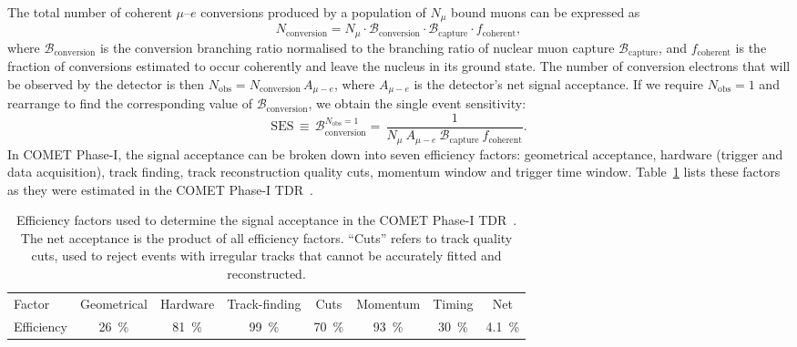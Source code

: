 The total number of coherent $\mu$--$e$ conversions produced by a
population of $N_\mu$ bound muons can be expressed as
$$
N_\mathrm{conversion} = N_\mu \cdot \mathcal{B}_\mathrm{conversion} \cdot
\mathcal{B}_\mathrm{capture} \cdot f_\mathrm{coherent},
$$
where $\mathcal{B}_\mathrm{conversion}$ is the conversion branching ratio
normalised to the branching ratio of nuclear muon capture
$\mathcal{B}_\mathrm{capture}$, and $f_\mathrm{coherent}$ is the fraction of
conversions estimated to occur coherently and leave the nucleus in its ground
state.
The number of conversion electrons that will be observed by the detector is then
$N_\mathrm{obs} = N_\mathrm{conversion}\, A_{\mu-e}$, where $A_{\mu-e}$ is the
detector's net signal acceptance. If we require $N_\mathrm{obs} = 1$ and
rearrange to find the corresponding value of $\mathcal{B}_\mathrm{conversion}$,
we obtain the single event sensitivity:
\begin{equation}\label{eq:ses}
\mathrm{SES} \, \equiv \, \mathcal{B}_\mathrm{conversion}^{N_\mathrm{obs}=1}
 = \, \frac{1}{N_\mu \  A_{\mu-e} \  
\mathcal{B}_\mathrm{capture} \  f_\mathrm{coherent}}.
\end{equation}
In COMET Phase-I, the signal acceptance can be broken down into seven efficiency
factors: geometrical acceptance, hardware (trigger and data acquisition), track finding,
track reconstruction quality cuts, momentum window and trigger time window.
Table~\ref{tab:acceptance} lists these factors as they were estimated in the
COMET Phase-I TDR~\cite[Section 10.1]{the_comet_collaboration_comet_2020}. 

\begin{table}
    \centering
    \begin{adjustbox}{max width=1.1\textwidth,center}
    \begin{tabular}{l|cccccc|c}
        \toprule
        Factor & Geometrical & Hardware & Track-finding & Cuts & Momentum
        & Timing & Net
        \\ 
        Efficiency & \SI{26}{\percent} & \SI{81}{\percent} &
        \SI{99}{\percent} & \SI{70}{\percent} & \SI{93}{\percent} &
        \SI{30}{\percent} & \SI{4.1}{\percent} \\
        \bottomrule
    \end{tabular}
    \end{adjustbox}
    \caption{ Efficiency factors used to determine the signal acceptance in the
    COMET Phase-I TDR~\cite{the_comet_collaboration_comet_2020}. The net
    acceptance is the product of all efficiency factors. ``Cuts'' refers to
    track quality cuts, used to reject events with irregular tracks that cannot
    be accurately fitted and reconstructed.}
    \label{tab:acceptance} 
\end{table}

